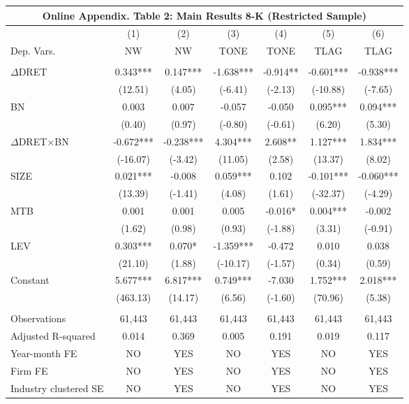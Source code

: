 \begin{table}[htbp] \label{oat2}
  \centering
    \begin{tabular}{lcccccc}
    \multicolumn{7}{c}{\textbf{Online Appendix. Table 2: Main Results 8-K (Restricted Sample)}} \\
    \midrule
      & (1) & (2) & (3) & (4) & (5) & (6) \\
    Dep. Vars. & NW & NW & TONE & TONE & TLAG & TLAG \\
    \midrule
      &   &   &   &   &   &  \\
    $\Delta$DRET & 0.343*** & 0.147*** & -1.638*** & -0.914** & -0.601*** & -0.938*** \\
      & (12.51) & (4.05) & (-6.41) & (-2.13) & (-10.88) & (-7.65) \\
    BN & 0.003 & 0.007 & -0.057 & -0.050 & 0.095*** & 0.094*** \\
      & (0.40) & (0.97) & (-0.80) & (-0.61) & (6.20) & (5.30) \\
    \rowcolor[rgb]{ .933,  .925,  .882} $\Delta$DRET$\times$BN & -0.672*** & -0.238*** & 4.304*** & 2.608** & 1.127*** & 1.834*** \\
    \rowcolor[rgb]{ .933,  .925,  .882}   & (-16.07) & (-3.42) & (11.05) & (2.58) & (13.37) & (8.02) \\
    SIZE & 0.021*** & -0.008 & 0.059*** & 0.102 & -0.101*** & -0.060*** \\
      & (13.39) & (-1.41) & (4.08) & (1.61) & (-32.37) & (-4.29) \\
    MTB & 0.001 & 0.001 & 0.005 & -0.016* & 0.004*** & -0.002 \\
      & (1.62) & (0.98) & (0.93) & (-1.88) & (3.31) & (-0.91) \\
    LEV & 0.303*** & 0.070* & -1.359*** & -0.472 & 0.010 & 0.038 \\
      & (21.10) & (1.88) & (-10.17) & (-1.57) & (0.34) & (0.59) \\
    Constant & 5.677*** & 6.817*** & 0.749*** & -7.030 & 1.752*** & 2.018*** \\
      & (463.13) & (14.17) & (6.56) & (-1.60) & (70.96) & (5.38) \\
      &   &   &   &   &   &  \\
    Observations & 61,443 & 61,443 & 61,443 & 61,443 & 61,443 & 61,443 \\
    Adjusted R-squared & 0.014 & 0.369 & 0.005 & 0.191 & 0.019 & 0.117 \\
    Year-month FE & NO & YES & NO & YES & NO & YES \\
    Firm FE & NO & YES & NO & YES & NO & YES \\
    Industry clustered SE & NO & YES & NO & YES & NO & YES \\
    \bottomrule
    \end{tabular}%
\end{table}%
